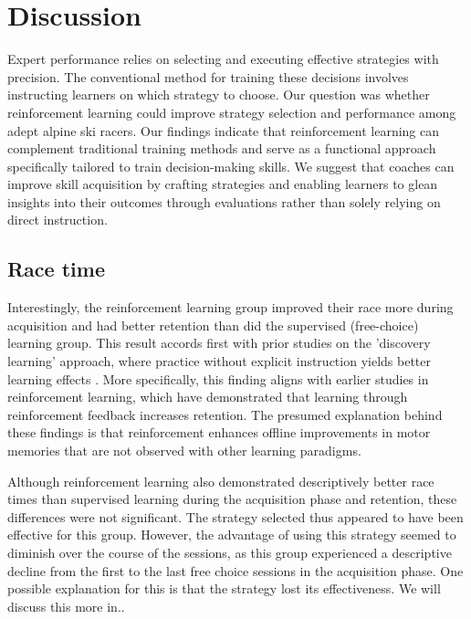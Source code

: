 \documentclass{article}
\begin{document}
\section{Discussion}

Expert performance relies on selecting and executing effective strategies with precision. The conventional method for training these decisions involves instructing learners on which strategy to choose. Our question was whether reinforcement learning could improve strategy selection and performance among adept alpine ski racers. Our findings indicate that reinforcement learning can complement traditional training methods and serve as a functional approach specifically tailored to train decision-making skills. We suggest that coaches can improve skill acquisition by crafting strategies and enabling learners to glean insights into their outcomes through evaluations rather than solely relying on direct instruction. 


\subsection{Race time}
Interestingly, the reinforcement learning group improved their race more during acquisition and had better retention than did the supervised (free-choice) learning group. This result accords first with prior studies on the 'discovery learning' approach, where practice without explicit instruction yields better learning effects \cite{wulf_instructions_1997, hodges_learning_2001}. More specifically, this finding aligns with earlier studies in reinforcement learning, which have demonstrated that learning through reinforcement feedback increases retention\cite{therrien_effective_2016, truong_error-based_2023, hasson_reinforcement_2015}. The presumed explanation behind these findings is that reinforcement enhances offline improvements in motor memories that are not observed with other learning paradigms. 

Although reinforcement learning also demonstrated descriptively better race times than supervised learning during the acquisition phase and retention, these differences were not significant. The strategy selected thus appeared to have been effective for this group. However, the advantage of using this strategy seemed to diminish over the course of the sessions, as this group experienced a descriptive decline from the first to the last free choice sessions in the acquisition phase. One possible explanation for this is that the strategy lost its effectiveness. We will discuss this more in..
\end{document}

